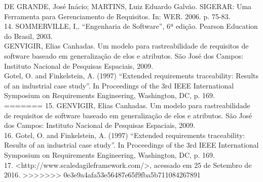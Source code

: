 DE GRANDE, José Inácio; MARTINS, Luiz Eduardo Galvão. SIGERAR: Uma Ferramenta para Gerenciamento de Requisitos. In: WER. 2006. p. 75-83.\\
14. SOMMERVILLE, I,. “Engenharia de Software”, 6ª edição. Pearson Education do Brasil, 2003.\\


GENVIGIR, Elias Canhadas. Um modelo para rastreabilidade de requisitos de software baseado em generalização de elos e atributos. São José dos Campos: Instituto Nacional de Pesquisas Espaciais, 2009.\\

Gotel, O. and Finkelstein, A. (1997) “Extended requirements traceability: Results of an industrial case study”. In Proceedings of the 3rd IEEE International Symposium on Requirements Engineering, Washington, DC, p. 169.\\

=======
15. GENVIGIR, Elias Canhadas. Um modelo para rastreabilidade de requisitos de software baseado em generalização de elos e atributos. São José dos Campos: Instituto Nacional de Pesquisas Espaciais, 2009.\\
16. Gotel, O. and Finkelstein, A. (1997) “Extended requirements traceability: Results of an industrial case study”. In Proceedings of the 3rd IEEE International Symposium on Requirements Engineering, Washington, DC, p. 169.\\
17. <http://www.scaledagileframework.com/>, acessado em 25 de Setembro de 2016.
>>>>>>> 0e3e9a4afa53e56487e65f9fba5b711084267891

